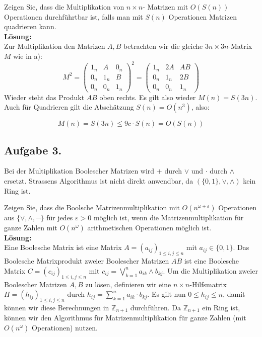 \documentclass[11pt,a4paper,ngerman]{article}
\begin{document}
Zeigen Sie, dass die Multiplikation von $n \times n$- Matrizen mit $O(S(n))$ Operationen durchführtbar ist, falls man mit $S(n)$ Operationen Matrizen quadrieren kann.\\

\textbf{Lösung:}\\
Zur Multiplikation den Matrizen $A,B$ betrachten wir die gleiche $3n \times 3n$-Matrix $M$ wie in a):
\begin{equation}\label{eq:square}
  M^{2} = \left(\begin{array}{ccc}
              1_n & A   & 0_n \\
              0_n & 1_n & B \\
              0_n & 0_n & 1_n
           \end{array}\right)^{2}
         = \left(\begin{array}{ccc}
              1_n & 2A   & AB \\
              0_n & 1_n & 2B \\
              0_n & 0_n & 1_n
           \end{array}\right)
\end{equation}
Wieder steht das Produkt $AB$ oben rechts. Es gilt also wieder $M(n) = S(3n)$. Auch für Quadrieren gilt
die Abschätzung $S(n) = O(n^3)$, also:

\begin{equation}
  M(n) = S(3n) {\leq} 9c\cdot S(n) = O(S(n))
\end{equation}


\subsection*{Aufgabe 3.}

Bei der Multiplikation Boolescher Matrizen wird $+$ durch $\lor$ und $\cdot$ durch $\land$ ersetzt. Strassens Algorithmus ist nicht direkt anwendbar, da $(\{0,1\}, \lor, \land)$ kein Ring ist.

Zeigen Sie, dass die Boolsche Matrizenmultiplikation mit $O( n^{\omega + \varepsilon} )$ Operationen aus $\{ \lor, \land, \neg \}$ für jedes $\varepsilon > 0$ möglich ist, wenn die Matrizenmultiplikation für ganze Zahlen mit $O(n^\omega )$ arithmetischen Operationen möglich ist.\\

\textbf{Lösung:}\\

Eine Boolesche Matrix ist eine Matrix $A = \left(a_{ij} \right)_{1 \leq i,j \leq n}$
mit $a_{ij} \in \{ 0,1 \}$. Das Boolesche Matrixprodukt zweier Boolescher Matrizen $AB$ ist eine
Boolesche Matrix $C = \left(c_{ij} \right)_{1 \leq i,j \leq n}$ mit 
$c_{ij} = \bigvee_{k = 1}^{n} a_{ik} \land b_{kj}$.
Um die Multiplikation zweier Boolescher Matrizen $A,B$ zu lösen,
definieren wir eine $n \times n$-Hilfsmatrix $H = \left(h_{ij} \right)_{1 \leq i,j \leq n}$ durch
$h_{ij} = \sum_{k=1}^{n} a_{ik}\cdot b_{kj}$. Es gilt nun $0 \leq h_{ij} \leq n$, damit können wir
diese Berechnungen in $\mathbb{Z}_{n+1}$  durchführen. Da $\mathbb{Z}_{n+1}$ ein Ring ist, können 
wir den Algorithmus für Matrizenmultiplikation für ganze Zahlen (mit $O(n^\omega)$ Operationen) nutzen.
\end{document}

